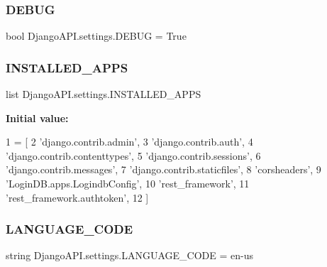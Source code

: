 \subsubsection{\texorpdfstring{D\+E\+B\+UG}{DEBUG}}
{\footnotesize\ttfamily bool Django\+A\+P\+I.\+settings.\+D\+E\+B\+UG = True}

\mbox{\label{namespace_django_a_p_i_1_1settings_aa71540b2a9c698a339ef61571830b37b}} 
\subsubsection{\texorpdfstring{I\+N\+S\+T\+A\+L\+L\+E\+D\+\_\+\+A\+P\+PS}{INSTALLED\_APPS}}
{\footnotesize\ttfamily list Django\+A\+P\+I.\+settings.\+I\+N\+S\+T\+A\+L\+L\+E\+D\+\_\+\+A\+P\+PS}

{\bfseries Initial value\+:}
\begin{DoxyCode}
1 =  [
2     \textcolor{stringliteral}{'django.contrib.admin'},
3     \textcolor{stringliteral}{'django.contrib.auth'},
4     \textcolor{stringliteral}{'django.contrib.contenttypes'},
5     \textcolor{stringliteral}{'django.contrib.sessions'},
6     \textcolor{stringliteral}{'django.contrib.messages'},
7     \textcolor{stringliteral}{'django.contrib.staticfiles'},
8     \textcolor{stringliteral}{'corsheaders'},
9     \textcolor{stringliteral}{'LoginDB.apps.LogindbConfig'},
10     \textcolor{stringliteral}{'rest\_framework'},
11     \textcolor{stringliteral}{'rest\_framework.authtoken'},
12 ]
\end{DoxyCode}
\mbox{\label{namespace_django_a_p_i_1_1settings_aa8e060b013d0a9853782508ba3f5ab82}} 
\subsubsection{\texorpdfstring{L\+A\+N\+G\+U\+A\+G\+E\+\_\+\+C\+O\+DE}{LANGUAGE\_CODE}}
{\footnotesize\ttfamily string Django\+A\+P\+I.\+settings.\+L\+A\+N\+G\+U\+A\+G\+E\+\_\+\+C\+O\+DE = \textquotesingle{}en-\/us\textquotesingle{}}

